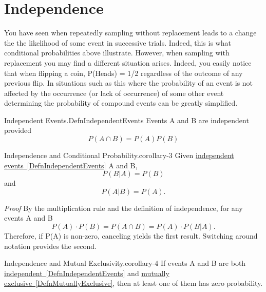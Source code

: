 \documentclass[10pt,]{book}
\makeatletter
\renewcommand*{\proofname}{Proof}
\renewenvironment{proof}[1][\proofname]{\par
  \pushQED{\qed}%
  \normalfont \topsep6\p@\@plus6\p@\relax
  \trivlist
  \item\relax
    {\itshape
    #1\@addpunct{.}}\hspace\labelsep\ignorespaces
}{%
  \popQED\endtrivlist\@endpefalse
}
\numberwithin{equation}{section}
\makeatother
\begin{document}
\section[{Independence}]{Independence}\label{section-29}
\hypertarget{p-594}{}%
You have seen when repeatedly sampling without replacement leads to a change the the likelihood of some event in successive trials. Indeed, this is what conditional probabilities above illustrate. However, when sampling with replacement you may find a different situation arises. Indeed, you easily notice that when flipping a coin, P(Heads) = 1/2 regardless of the outcome of any previous flip.  In situations such as this where the probability of an event is not affected by the occurrence (or lack of occurrence) of some other event determining the probability of compound events can be greatly simplified.%
\hypertarget{p-595}{}%
\begin{definition}{Independent Events.}{DefnIndependentEvents}%
\hypertarget{p-596}{}%
Events A and B are independent provided%
\begin{equation*}
P(A \cap B) = P(A) P(B)
\end{equation*}
%
\end{definition}
%
\par
\hypertarget{p-597}{}%
\begin{corollary}{Independence and Conditional Probability.}{}{corollary-3}%
\hypertarget{p-598}{}%
Given \hyperref[DefnIndependentEvents]{independent events~\ref{DefnIndependentEvents}} A and B,%
\begin{equation*}
P(B | A) = P(B)
\end{equation*}
and%
\begin{equation*}
P(A | B) = P(A).
\end{equation*}
%
\end{corollary}
\begin{proof}\hypertarget{proof-22}{}
\hypertarget{p-599}{}%
By the multiplication rule and the definition of independence, for any events A and B%
\begin{equation*}
P(A) \cdot P(B) = P(A \cap B) = P(A) \cdot P(B | A) .
\end{equation*}
Therefore, if P(A) is non-zero, canceling yields the first result. Switching around notation provides the second.%
\end{proof}
%
\par
\hypertarget{p-600}{}%
\begin{corollary}{Independence and Mutual Exclusivity.}{}{corollary-4}%
\hypertarget{p-601}{}%
If events A and B are both \hyperref[DefnIndependentEvents]{independent~\ref{DefnIndependentEvents}} and \hyperref[DefnMutuallyExclusive]{mutually exclusive~\ref{DefnMutuallyExclusive}}, then at least one of them has zero probability.%
\end{corollary}
\end{document}
